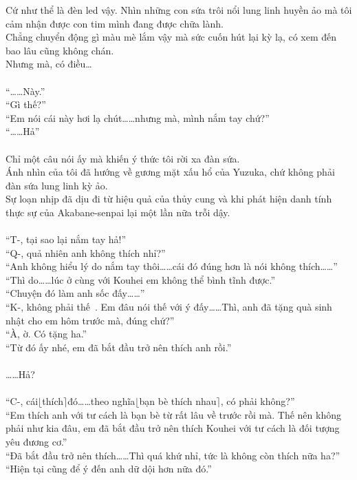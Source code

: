 \documentclass[12pt,a4paper, twosides]{book}
\begin{document}
Cứ như thể là đèn led vậy. Nhìn những con sứa trôi nổi lung linh huyền ảo mà tôi cảm nhận được con tim mình đang được chữa lành.\\
Chẳng chuyển động gì màu mè lắm vậy mà sức cuốn hút lại kỳ lạ, có xem đến bao lâu cũng không chán.\\
Nhưng mà, có điều…\\
\\
“……Này.”\\
“Gì thế?”\\
“Em nói cái này hơi lạ chút……nhưng mà, mình nắm tay chứ?”\\
“……Hả”\\
\\
Chỉ một câu nói ấy mà khiến ý thức tôi rời xa đàn sứa.\\
Ánh nhìn của tôi đã hướng về gương mặt xấu hổ của Yuzuka, chứ không phải đàn sứa lung linh kỳ ảo.\\
Sự loạn nhịp đã dịu đi từ hiệu quả của thủy cung và khi phát hiện danh tính thực sự của Akabane-senpai lại một lần nữa trỗi dậy.\\
\\
“T-, tại sao lại nắm tay hả!”\\
“Q-, quả nhiên anh không thích nhỉ?”\\
“Anh không hiểu lý do nắm tay thôi……cái đó đúng hơn là nói không thích……”\\
“Thì do……lúc ở cùng với Kouhei em không thể bình tĩnh được.”\\
“Chuyện đó làm anh sốc đấy……”\\
“K-, không phải thế~. Em đâu nói thế với ý đấy……Thì, anh đã tặng quà sinh nhật cho em hôm trước mà, đúng chứ?”\\
“À, ờ. Có tặng ha.”\\
“Từ đó ấy nhé, em đã bắt đầu trở nên thích anh rồi.”\\
\\
……Hả?\\
\\
“C-, cái$\lfloor$thích$\rceil$đó……theo nghĩa$\lfloor$bạn bè thích nhau$\rceil$, có phải không?”\\
“Em thích anh với tư cách là bạn bè từ rất lâu về trước rồi mà. Thế nên không phải như kia đâu, em đã bắt đầu trở nên thích Kouhei với tư cách là đối tượng yêu đương cơ.”\\
“Đã bắt đầu trở nên thích……Thì quá khứ nhỉ, tức là không còn thích nữa ha?”\\
“Hiện tại cũng để ý đến anh dữ dội hơn nữa đó.”\\
\end{document}
